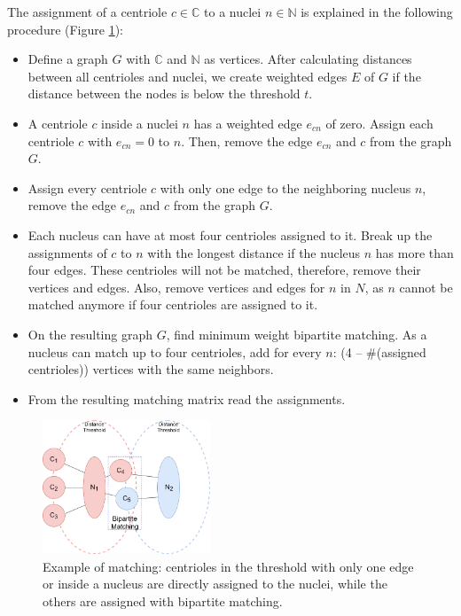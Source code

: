 \documentclass[9pt,conference,compsocconf, article]{IEEEtran}
\begin{document}
The assignment of a centriole $c\in\mathbb{C}$ to a nuclei $n\in\mathbb{N}$ is explained in the following procedure (Figure \ref{fig:matching_ex}):
\begin{itemize}
\item Define a graph $G$ with $\mathbb{C}$ and $\mathbb{N}$ as vertices. After calculating distances between all centrioles and nuclei, we create weighted edges $E$ of $G$ if the distance between the nodes is below the threshold $t$.
\item A centriole $c$ inside a nuclei $n$ has a weighted edge $e_{cn}$ of zero. Assign each centriole $c$ with $e_{cn}=0$ to $n$. Then, remove the edge $e_{cn}$ and $c$ from the graph $G$.
\item Assign every centriole $c$ with only one edge to the neighboring nucleus $n$, remove the edge $e_{cn}$ and $c$ from the graph $G$.
\item Each nucleus can have at most four centrioles assigned to it. Break up the assignments of $c$ to $n$ with the longest distance if the nucleus $n$ has more than four edges. These centrioles will not be matched, therefore, remove their vertices and edges. Also, remove vertices and edges for $n$ in $N$, as $n$ cannot be matched anymore if four centrioles are assigned to it. 
\item On the resulting graph $G$, find minimum weight bipartite matching. As a nucleus can match up to four centrioles, add for every $n$: (4 – \#(assigned centrioles)) vertices with the same neighbors.
\item From the resulting matching matrix read the assignments.
\end{itemize}

\begin{figure}[h!]
    \centering
    \includegraphics[width=50mm,scale=0.5]{images/Matching.png}
    \caption{Example of matching: centrioles in the threshold with only one edge or inside a nucleus are directly assigned to the nuclei, while the others are assigned with bipartite matching.
    }
    \label{fig:matching_ex}
\end{figure}
\end{document}
